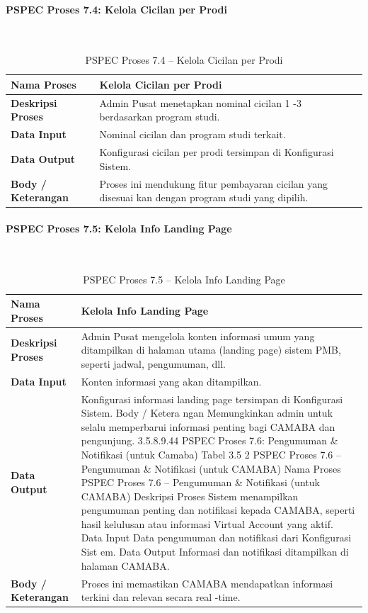 \paragraph{PSPEC Proses 7.4: Kelola Cicilan per Prodi}~\\
\begin{longtable}{|p{}|p{}|}
	\caption{PSPEC Proses 7.4 -- Kelola Cicilan per Prodi}
	\label{table:3.pspec74}\\
	\hline
	\textbf{Nama Proses} & Kelola Cicilan per Prodi \\
	\hline
	\textbf{Deskripsi Proses} & Admin Pusat menetapkan nominal cicilan 1 -3 berdasarkan program studi. \\
	\hline
	\textbf{Data Input} & Nominal cicilan dan program studi terkait. \\
	\hline
	\textbf{Data Output} & Konfigurasi cicilan per prodi tersimpan di Konfigurasi Sistem. \\
	\hline
	\textbf{Body / Keterangan} & Proses ini mendukung fitur pembayaran cicilan yang disesuai kan dengan program studi yang dipilih. \\
	\hline
\end{longtable}


\paragraph{PSPEC Proses 7.5: Kelola Info Landing Page}~\\
\begin{longtable}{|p{}|p{}|}
	\caption{PSPEC Proses 7.5 -- Kelola Info Landing Page}
	\label{table:3.pspec75}\\
	\hline
	\textbf{Nama Proses} & Kelola Info Landing Page \\
	\hline
	\textbf{Deskripsi Proses} & Admin Pusat mengelola konten informasi umum yang ditampilkan di halaman utama (landing page) sistem PMB, seperti jadwal, pengumuman, dll. \\
	\hline
	\textbf{Data Input} & Konten informasi yang akan ditampilkan. \\
	\hline
	\textbf{Data Output} & Konfigurasi informasi landing page tersimpan di Konfigurasi Sistem. Body / Ketera ngan Memungkinkan admin untuk selalu memperbarui informasi penting bagi CAMABA dan pengunjung. 3.5.8.9.44 PSPEC Proses 7.6: Pengumuman \& Notifikasi (untuk Camaba) Tabel 3.5 2 PSPEC Proses 7.6 – Pengumuman \& Notifikasi (untuk CAMABA) Nama Proses PSPEC Proses 7.6 – Pengumuman \& Notifikasi (untuk CAMABA) Deskripsi Proses Sistem menampilkan pengumuman penting dan notifikasi kepada CAMABA, seperti hasil kelulusan atau informasi Virtual Account yang aktif. Data Input Data pengumuman dan notifikasi dari Konfigurasi Sist em. Data Output Informasi dan notifikasi ditampilkan di halaman CAMABA. \\
	\hline
	\textbf{Body / Keterangan} & Proses ini memastikan CAMABA mendapatkan informasi terkini dan relevan secara real -time. \\
	\hline
\end{longtable}


